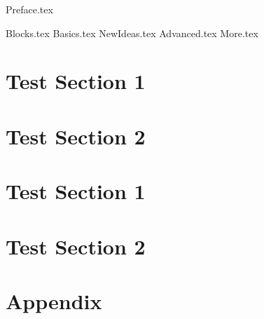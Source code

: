 \documentclass[
    twoside,
]{styles/mori-book}%
\begin{document}
    \maketitlepage

    \frontmatter
    \pagestyle{front}
    {Preface.tex}

    \maketocpage

    \mainmatter

    \pagestyle{main}

    {Blocks.tex}
    {Basics.tex}
    {NewIdeas.tex}
    {Advanced.tex}
    {More.tex}

    \setcounter{chapter}{8}
    
     \label{chap:TC1}
    
    \section{Test Section 1} \label{sec:9TS1}
    \lipsum[1-5]
    
    \setcounter{section}{9}
    
    \section{Test Section 2}
    
    \lipsum[6-9]
    
    \lipsum[1-2]
    
    \section{Test Section 1}
    
    \setcounter{section}{9}
    
    \section{Test Section 2}

    \appendix
    \section{Appendix}

    \backmatter


    \lipsum[2-3]
    
\end{document}
